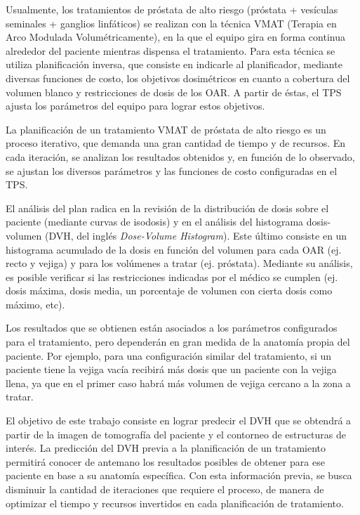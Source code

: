 \documentclass[
11pt, %
codirector, %
]{charter}
\begin{document}
Usualmente, los tratamientos de próstata de alto riesgo (próstata + vesículas seminales + ganglios linfáticos) se realizan con la técnica VMAT (Terapia en Arco Modulada Volumétricamente), en la que el equipo gira en forma continua alrededor del paciente mientras dispensa el tratamiento. Para esta técnica se utiliza planificación inversa, que consiste en indicarle al planificador, mediante diversas funciones de costo, los objetivos dosimétricos en cuanto a cobertura del volumen blanco y restricciones de dosis de los OAR. A partir de éstas, el TPS ajusta los parámetros del equipo para lograr estos objetivos.

La planificación de un tratamiento VMAT de próstata de alto riesgo es un proceso iterativo, que demanda una gran cantidad de tiempo y de recursos. En cada iteración, se analizan los resultados obtenidos y, en función de lo observado, se ajustan los diversos parámetros y las funciones de costo configuradas en el TPS. 

El análisis del plan radica en la revisión de la distribución de dosis sobre el paciente (mediante curvas de isodosis) y en el análisis del histograma dosis-volumen (DVH, del inglés \textit{Dose-Volume Histogram}). Este último consiste en un histograma acumulado de la dosis en función del volumen para cada OAR (ej. recto y vejiga) y para los volúmenes a tratar (ej. próstata). Mediante su análisis, es posible verificar si las restricciones indicadas por el médico se cumplen (ej. dosis máxima, dosis media, un porcentaje de volumen con cierta dosis como máximo, etc). 

Los resultados que se obtienen están asociados a los parámetros configurados para el tratamiento, pero dependerán en gran medida de la anatomía propia del paciente. Por ejemplo, para una configuración similar del tratamiento, si un paciente tiene la vejiga vacía recibirá más dosis que un paciente con la vejiga llena, ya que en el primer caso habrá más volumen de vejiga cercano a la zona a tratar.

El objetivo de este trabajo consiste en lograr predecir el DVH que se obtendrá a partir de la imagen de tomografía del paciente y el contorneo de estructuras de interés. La predicción del DVH previa a la planificación de un tratamiento permitirá conocer de antemano los resultados posibles de obtener para ese paciente en base a su anatomía específica. Con esta información previa, se busca disminuir la cantidad de iteraciones que requiere el proceso, de manera de optimizar el tiempo y recursos invertidos en cada planificación de tratamiento. 
\end{document}
